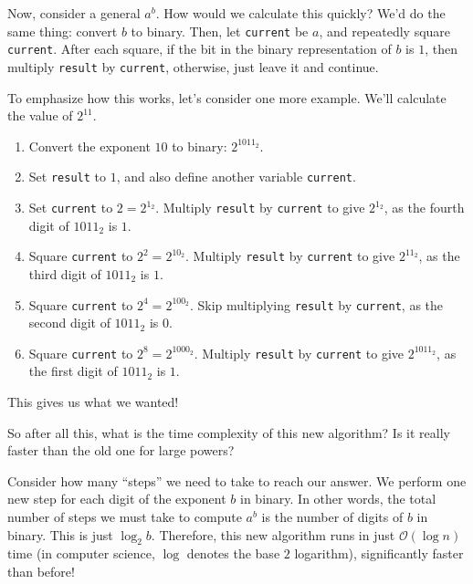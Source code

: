 \documentclass{article}
\begin{document}
\begin{multicols}{3}
Now, consider a general $a^b$. How would we calculate this quickly? We'd do the same thing: convert $b$ to binary. Then, let \texttt{current} be $a$, and repeatedly square \texttt{current}. After each square, if the bit in the binary representation of $b$ is $1$, then multiply \texttt{result} by \texttt{current}, otherwise, just leave it and continue.

To emphasize how this works, let's consider one more example. We'll calculate the value of $2^{11}$.

\begin{enumerate}
    \item Convert the exponent $10$ to binary: $2^{1011_2}$.

    \item Set \texttt{result} to $1$, and also define another variable \texttt{current}.

    \item Set \texttt{current} to $2=2^{1_2}$. Multiply \texttt{result} by \texttt{current} to give $2^{1_2}$, as the fourth digit of $1011_2$ is $1$.

    \item Square \texttt{current} to $2^2=2^{10_2}$. Multiply \texttt{result} by \texttt{current} to give $2^{11_2}$, as the third digit of $1011_2$ is $1$.

    \item Square \texttt{current} to $2^4=2^{100_2}$. Skip multiplying \texttt{result} by \texttt{current}, as the second digit of $1011_2$ is $0$.

    \item Square \texttt{current} to $2^8=2^{1000_2}$. Multiply \texttt{result} by \texttt{current} to give $2^{1011_2}$, as the first digit of $1011_2$ is $1$.
\end{enumerate}

This gives us what we wanted!

So after all this, what is the time complexity of this new algorithm? Is it really faster than the old one for large powers?

Consider how many ``steps'' we need to take to reach our answer. We perform one new step for each digit of the exponent $b$ in binary. In other words, the total number of steps we must take to compute $a^b$ is the number of digits of $b$ in binary. This is just $\log_2{b}$. Therefore, this new algorithm runs in just $\mathcal{O}(\log{n})$ time (in computer science, $\log$ denotes the base $2$ logarithm), significantly faster than before!


\end{multicols}
\end{document}
